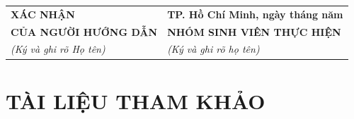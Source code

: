 \documentclass[14pt]{article}
\begin{document}
\vspace{1.5cm}
\noindent
\begin{tabular}{p{}p{}}
    \centering\textbf{XÁC NHẬN} &
    \centering\textbf{TP. Hồ Chí Minh, ngày \hspace{1cm} tháng \hspace{1cm} năm} \tabularnewline[4pt]
    \centering\textbf{CỦA NGƯỜI HƯỚNG DẪN} &
    \centering\textbf{NHÓM SINH VIÊN THỰC HIỆN} \tabularnewline[4pt]
    \centering\textit{(Ký và ghi rõ Họ tên)} &
    \centering\textit{(Ký và ghi rõ họ tên)} \tabularnewline
\end{tabular}

\vspace{3cm}

\section{TÀI LIỆU THAM KHẢO}
\end{document}
